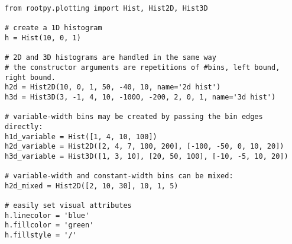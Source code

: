 \begin{footnotesize}
\begin{verbatim}
from rootpy.plotting import Hist, Hist2D, Hist3D

# create a 1D histogram
h = Hist(10, 0, 1)

# 2D and 3D histograms are handled in the same way
# the constructor arguments are repetitions of #bins, left bound, right bound.
h2d = Hist2D(10, 0, 1, 50, -40, 10, name='2d hist')
h3d = Hist3D(3, -1, 4, 10, -1000, -200, 2, 0, 1, name='3d hist')

# variable-width bins may be created by passing the bin edges directly:
h1d_variable = Hist([1, 4, 10, 100])
h2d_variable = Hist2D([2, 4, 7, 100, 200], [-100, -50, 0, 10, 20])
h3d_variable = Hist3D([1, 3, 10], [20, 50, 100], [-10, -5, 10, 20])

# variable-width and constant-width bins can be mixed:
h2d_mixed = Hist2D([2, 10, 30], 10, 1, 5)

# easily set visual attributes
h.linecolor = 'blue'
h.fillcolor = 'green'
h.fillstyle = '/'
\end{verbatim}
\end{footnotesize}
